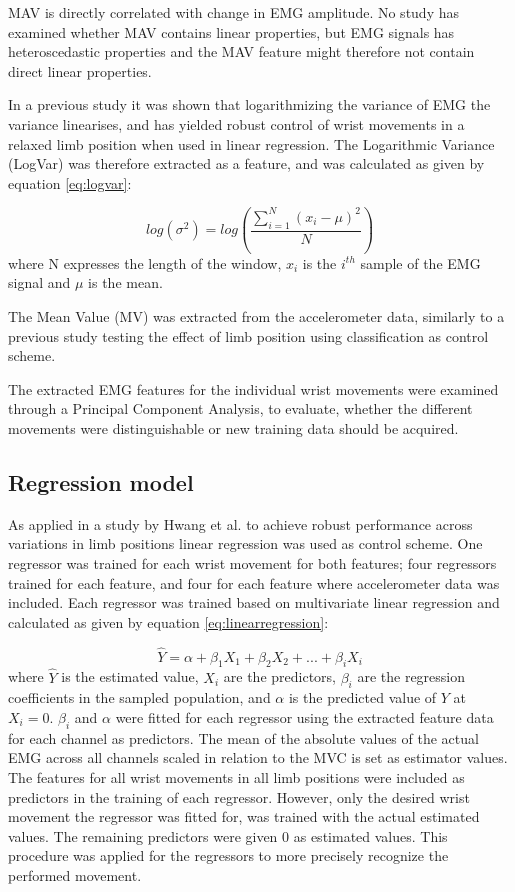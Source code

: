 \begin{multicols}{2}
MAV is directly correlated with change in EMG amplitude. No study has examined whether MAV contains linear properties, but EMG signals has heteroscedastic properties \cite{rasool2012} and the MAV feature might therefore not contain direct linear properties.

In a previous study \cite{hahne2014} it was shown that logarithmizing the variance of EMG the variance linearises, and has yielded robust control of wrist movements in a relaxed limb position when used in linear regression. The Logarithmic Variance (LogVar) was therefore extracted as a feature, and was calculated as given by equation \ref{eq:logvar}:

\begin{equation} \label{eq:logvar}
log(\sigma^2) = log(\frac{\sum\limits_{i=1}^N(x_i - \mu)^2}{N})
\end{equation}
where N expresses the length of the window, $x_i$ is the $i^{th}$ sample of the EMG signal and $\mu$ is the mean.

The Mean Value (MV) was extracted from the accelerometer data, similarly to a previous study \cite{Krasoulis2015} testing the effect of limb position using classification as control scheme. 

The extracted EMG features for the individual wrist movements were examined through a Principal Component Analysis, to evaluate, whether the different movements were distinguishable or new training data should be acquired.

\subsection{Regression model}
As applied in a study by Hwang et al. \cite{hwang2017} to achieve robust performance across variations in limb positions linear regression was used as control scheme. One regressor was trained for each wrist movement for both features; four regressors trained for each feature, and four for each feature where accelerometer data was included. Each regressor was trained based on multivariate linear regression and calculated as given by equation \ref{eq:linearregression}:

\begin{equation} \label{eq:linearregression}
\hat{Y} = \alpha + \beta_1 X_{1} + \beta_2 X_{2} + ... + \beta_i X_{i}
\end{equation}
where $\hat{Y}$ is the estimated value, $X_i$ are the predictors, $\beta_i$ are the regression coefficients in the sampled population, and $\alpha$ is the predicted value of $Y$ at $X_{i} = 0$. $\beta_i$ and $\alpha$ were fitted for each regressor using the extracted feature data for each channel as predictors. The mean of the absolute values of the actual EMG across all channels scaled in relation to the MVC is set as estimator values. The features for all wrist movements in all limb positions were included as predictors in the training of each regressor. However, only the desired wrist movement the regressor was fitted for, was trained with the actual estimated values. The remaining predictors were given 0 as estimated values. This procedure was applied for the regressors to more precisely recognize the performed movement.


\end{multicols}
